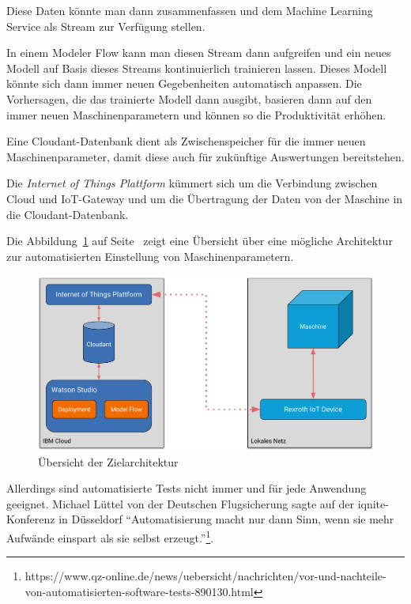 Diese Daten könnte man dann zusammenfassen und dem Machine Learning Service als Stream zur Verfügung stellen.

In einem Modeler Flow kann man diesen Stream dann aufgreifen und ein neues Modell auf Basis dieses Streams
kontinuierlich trainieren lassen. Dieses Modell könnte sich dann immer neuen Gegebenheiten automatisch anpassen. Die
Vorhersagen, die das trainierte Modell dann ausgibt, basieren dann auf den immer neuen Maschinenparametern und können
so die Produktivität erhöhen.

Eine Cloudant-Datenbank dient als Zwischenspeicher für die immer neuen Maschinenparameter, damit diese auch für
zukünftige Auswertungen bereitstehen.

Die \textit{Internet of Things Plattform} kümmert sich um die Verbindung zwischen Cloud und IoT-Gateway und um die
Übertragung der Daten von der Maschine in die Cloudant-Datenbank.

Die Abbildung~\ref{fig:ausblick_uebersicht} auf Seite~\pageref{fig:ausblick_uebersicht} zeigt eine Übersicht über eine
mögliche Architektur zur automatisierten Einstellung von Maschinenparametern.

\begin{figure}[h]
    \centering
    \includegraphics[width=\textwidth]{images/kapitel_6/architektur_uebersicht.pdf}
    \caption{Übersicht der Zielarchitektur}
    \label{fig:ausblick_uebersicht}
\end{figure}

Allerdings sind automatisierte Tests nicht immer und für jede Anwendung geeignet. Michael Lüttel von der Deutschen
Flugsicherung sagte auf der iqnite-Konferenz in Düsseldorf \enquote{Automatisierung macht nur dann Sinn, wenn sie mehr
Aufwände einspart als sie selbst
erzeugt.}\footnote{https://www.qz-online.de/news/uebersicht/nachrichten/vor-und-nachteile-von-automatisierten-software-tests-890130.html}.

